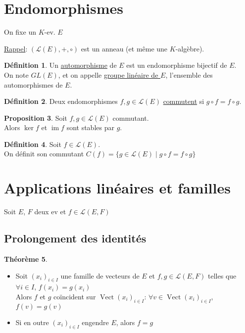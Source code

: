 \documentclass[10pt,a4paper]{article}
\theoremstyle{definition}
\newtheorem{proposition}{Proposition}[section]
\newtheorem{theorem}[proposition]{Théorème}
\newtheorem{definition}[proposition]{Définition}
\DeclareMathOperator{\vect}{Vect}
\DeclareMathOperator{\im}{im}
\begin{document}
\section{Endomorphismes}
On fixe un $K$-ev. $E$ \medskip

\uline{Rappel}: $(\mathcal{L}(E), +, \circ)$ est un anneau (et même une $K$-algèbre).
\begin{definition}
Un \uline{automorphisme} de $E$ est un endomorphisme bijectif de $E$. \\
On note $GL(E)$, et on appelle \uline{groupe linéaire de $E$}, l'ensemble des automorphismes de $E$.
\end{definition}
\begin{definition}
Deux endomorphismes $f, g \in \mathcal{L}(E)$ \uline{commutent} si $g \circ f = f \circ g$.
\end{definition}
\begin{proposition}
Soit $f, g \in \mathcal{L}(E)$ commutant. \\
Alors $\ker f$ et $\im f$ sont stables par $g$.
\end{proposition}
\begin{definition}
Soit $f \in \mathcal{L}(E)$. \\
On définit son commutant $C(f) = \{ g \in \mathcal{L}(E) \mid g \circ f = f \circ g \}$
\end{definition}

\section{Applications linéaires et familles}
Soit $E$, $F$ deux ev et $f \in \mathcal{L}(E, F)$
\subsection{Prolongement des identités}
\begin{theorem}
\hfill
\begin{itemize}
\item Soit $(x_i)_{i \in I}$ une famille de vecteurs de $E$ et $f,g \in \mathcal{L}(E, F)$ telles que $\forall i \in I$, $f(x_i) = g(x_i)$ \\
Alors $f$ et $g$ coïncident sur $\vect(x_i)_{i \in I}$: $\forall v \in \vect(x_i)_{i \in I}$, $f(v) = g(v)$
\item Si en outre $(x_i)_{i \in I}$ engendre $E$, alors $f = g$
\end{itemize}
\end{theorem}
\end{document}

